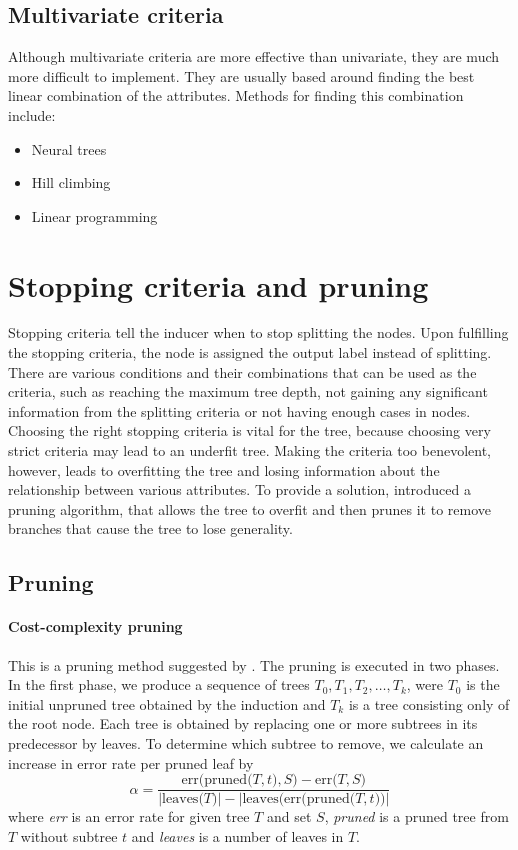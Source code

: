 \documentclass[thesis=B,english]{FITthesis}[2012/10/20]
\begin{document}
		\subsection{Multivariate criteria}
			Although multivariate criteria are more effective than univariate, they are much more difficult to implement. They are usually based around finding the best linear combination of the attributes. Methods for finding this combination include:
			\begin{itemize}
				\item Neural trees \cite{NTrees}
				\item Hill climbing \cite{CART}
				\item Linear programming
			\end{itemize}

		\section{Stopping criteria and pruning}
			Stopping criteria tell the inducer when to stop splitting the nodes. Upon fulfilling the stopping criteria, the node is assigned the output label instead of splitting. There are various conditions and their combinations that can be used as the criteria, such as reaching the maximum tree depth, not gaining any significant information from the splitting criteria or not having enough cases in nodes. Choosing the right stopping criteria is vital for the tree, because choosing very strict criteria may lead to an underfit tree. Making the criteria too benevolent, however, leads to overfitting the tree and losing information about the relationship between various attributes. To provide a solution, \cite{CART} introduced a pruning algorithm, that allows the tree to overfit and then prunes it to remove branches that cause the tree to lose generality.
				
		\subsection{Pruning}
		\label{sec:pruning}
				\paragraph*{Cost-complexity pruning}

				This is a pruning method suggested by \cite{CART}. The pruning is executed in two phases. In the first phase, we produce a sequence of trees \(T_0, T_1, T_2, \dots, T_k \), were \(T_0\) is the initial unpruned tree obtained by the induction and \(T_k\) is a tree consisting only of the root node. Each tree is obtained by replacing one or more subtrees in its predecessor by leaves. To determine which subtree to remove, we calculate an increase in error rate per pruned leaf by 
				\[\alpha = \frac{\mathrm{err(pruned(}T,t\mathrm{)},S\mathrm{)} - \mathrm{err(}T,S\mathrm{)}}{|\mathrm{leaves(}T\mathrm{)}|-|\mathrm{leaves(}\mathrm{err(pruned(}T,t\mathrm{)}\mathrm{)}|}\]
				where \emph{err} is an error rate for given tree \(T\) and set \(S\), \emph{pruned} is a pruned tree from \(T\) without subtree \(t\) and \emph{leaves} is a number of leaves in \(T\).
\end{document}
